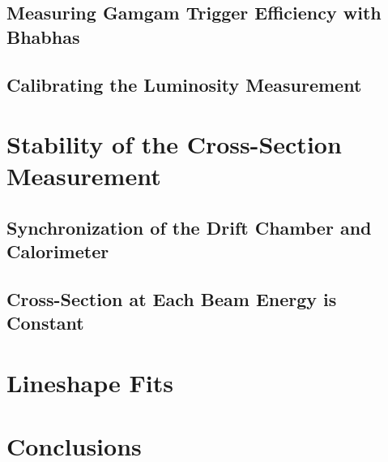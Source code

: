 \documentclass[aps,prd,preprint,superscriptaddress,tightenlines,nofootinbib,floatfix]{revtex4}
\begin{document}
%
\subsection{Measuring Gamgam Trigger Efficiency with Bhabhas}
%

%
\subsection{Calibrating the Luminosity Measurement}
%

%
\section{Stability of the Cross-Section Measurement}
%

%
\subsection{Synchronization of the Drift Chamber and Calorimeter}
%

%
\subsection{Cross-Section at Each Beam Energy is Constant}
%

%
\section{Lineshape Fits}
%




%
\section{Conclusions}
%
\end{document}

